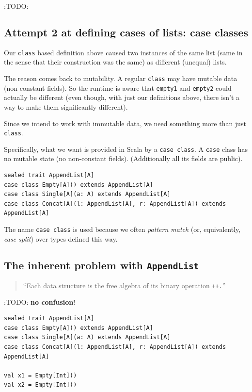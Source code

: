 \documentclass[11pt]{article}
\begin{document}
:TODO:

\subsection{Attempt 2 at defining cases of lists: case classes}
\label{sec:org72390be}
Our \texttt{class} based definition above caused two instances
of the same list (same in the sense that their construction was the same)
as different (unequal) lists.

The reason comes back to mutability.
A regular \texttt{class} may have mutable data (non-constant fields).
So the runtime is aware that \texttt{empty1} and \texttt{empty2} could
actually be different (even though, with just our definitions above,
there isn't a way to make them significantly different).

Since we intend to work with immutable data,
we need something more than just \texttt{class}.

Specifically, what we want is provided in
Scala by a \texttt{case class}.
A \texttt{case} class has no mutable state (no non-constant fields).
(Additionally all its fields are public).
\begin{verbatim}
sealed trait AppendList[A]
case class Empty[A]() extends AppendList[A]
case class Single[A](a: A) extends AppendList[A]
case class Concat[A](l: AppendList[A], r: AppendList[A]) extends AppendList[A]
\end{verbatim}

The name \texttt{case class} is used because
we often \emph{pattern match} (or, equivalently, \emph{case split})
over types defined this way.

\subsection{The inherent problem with \texttt{AppendList}}
\label{sec:org1bb0728}
\begin{quote}
“Each data structure is the free algebra of its binary operation \texttt{++.}”
\end{quote}

:TODO: \textbf{no confusion}!

\begin{verbatim}
sealed trait AppendList[A]
case class Empty[A]() extends AppendList[A]
case class Single[A](a: A) extends AppendList[A]
case class Concat[A](l: AppendList[A], r: AppendList[A]) extends AppendList[A]

val x1 = Empty[Int]()
val x2 = Empty[Int]()
\end{verbatim}
\end{document}
